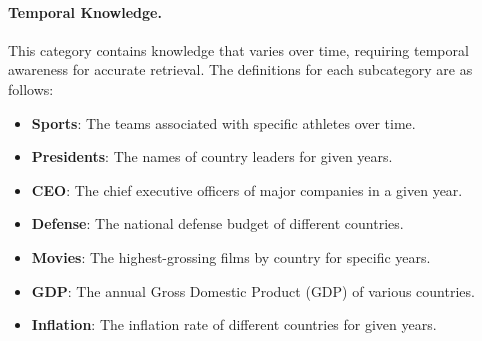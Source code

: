 \paragraph{Temporal Knowledge.} This category contains knowledge that varies over time, requiring temporal awareness for accurate retrieval. 
The definitions for each subcategory are as follows:
\begin{itemize}
    \item \textbf{Sports}: The teams associated with specific athletes over time.
    \item \textbf{Presidents}: The names of country leaders for given years.
    \item \textbf{CEO}: The chief executive officers of major companies in a given year.
    \item \textbf{Defense}: The national defense budget of different countries.
    \item \textbf{Movies}: The highest-grossing films by country for specific years.
    \item \textbf{GDP}: The annual Gross Domestic Product (GDP) of various countries.
    \item \textbf{Inflation}: The inflation rate of different countries for given years.
\end{itemize}

